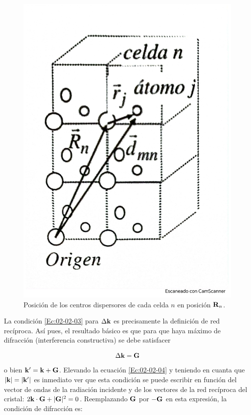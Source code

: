 \begin{figure}[h!] \centering
    \includegraphics[scale=0.30]{Cuerpo/Ch_02/Fotos_libro 3.pdf}
    \caption{Posición de los centros dispersores de cada celda $n$ en posición $\mathbf{R}_n$.}
    \label{Fig:02-03}
\end{figure}



La condición \ref{Ec:02-02-03} para $\Delta \mathbf{k}$ es precisamente la definición de red recíproca. Así pues, el resultado básico es que para que haya máximo de difracción (interferencia constructiva) se debe satisfacer 


\begin{equation}
    \Delta \mathbf{k} = \mathbf{G}\label{Ec:02-02-04}
\end{equation}
o bien $\mathbf{k}'=\mathbf{k}+\mathbf{G}$. Elevando la ecuación \ref{Ec:02-02-04} y teniendo en cuanta que $|\mathbf{k}|=|\mathbf{k}'|$ es inmediato ver que esta condición se puede escribir en función del vector de ondas de la radiación incidente y de los vectores de la red recíproca del cristal: $2\mathbf{k} \cdot \mathbf{G} + |\mathbf{G}|^2 = 0$. Reemplazando $\mathbf{G}$ por $-\mathbf{G}$ en esta expresión, la condición de difracción es: 

